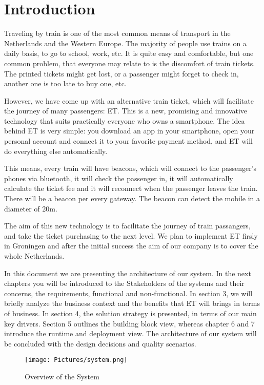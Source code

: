 

\section{Introduction}
Traveling by train is one of the most common means of transport in the Netherlands and the Western Europe. The majority of people use trains on a daily basis, to go to school, work, etc. It is quite easy and comfortable, but one common problem, that everyone may relate to is the discomfort of train tickets. The printed tickets might get lost, or a passenger might forget to check in, another one is too late to buy one, etc. 

However, we have come up with an alternative train ticket, which will facilitate the journey of many passengers: \ac{ET}. This is a new, promising and innovative technology that suits practically everyone who owns a smartphone. The idea  behind \ac{ET} is very simple: you download an app in your smartphone, open your personal account and connect it to your favorite payment method, and \ac{ET} will do everything else automatically. 

This means, every train will have beacons, which will connect to the passenger’s phones via  bluetooth, it will check the passenger in,  it will automatically calculate the ticket fee and it will reconnect  when the passenger leaves the train. There will be a beacon per every gateway. The beacon can detect the mobile in a diameter of 20m.

The aim of this new technology is to facilitate the journey of train passangers, and take the ticket purchasing to the next level. We plan to implement \ac{ET} firsly in Groningen and after the initial success the aim of our company is to cover the whole Netherlands. 

In this document we are presenting the architecture of our system. In the next chapters you will be introduced to the Stakeholders of the systems and their concerns, the requirements, functional and non-functional.  In section 3, we will briefly analyze the business context and the benefits that \ac{ET} will brings in terms of business. In section 4, the solution strategy is presented, in terms of our main key drivers. Section 5 outlines the building block view, whereas chapter 6 and 7 introduce the runtime and deployment view. The architecture of our system will be concluded with the design decisions and quality scenarios. 

\begin{figure}[H]
  \centering
  \texttt{[image: Pictures/system.png]}
  \caption{Overview of the System}
  \label{fig:system}
\end{figure}

